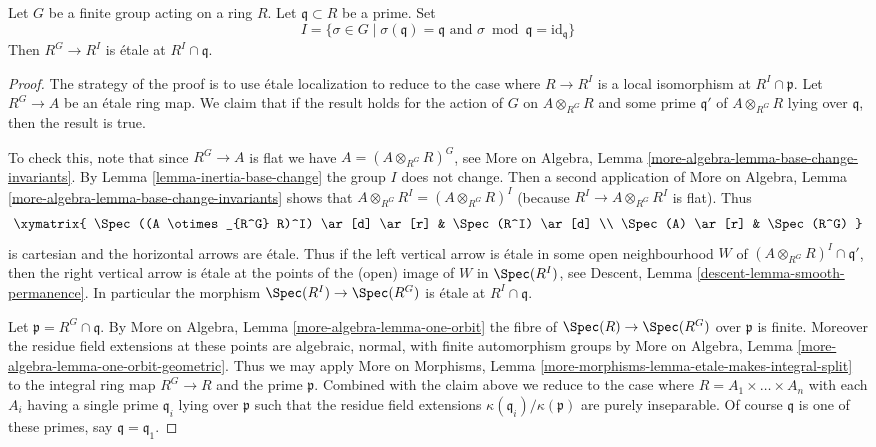 \begin{lemma}
\label{lemma-inertia-invariants-etale}
Let $G$ be a finite group acting on a ring $R$. Let $\mathfrak q \subset R$
be a prime. Set
$$
I = \{\sigma \in G \mid \sigma(\mathfrak q) = \mathfrak q
\text{ and } \sigma \bmod \mathfrak q = \text{id}_\mathfrak q\}
$$
Then $R^G \to R^I$ is \'etale at $R^I \cap \mathfrak q$.
\end{lemma}

\begin{proof}
The strategy of the proof is to use \'etale localization to
reduce to the case where $R \to R^I$ is a local isomorphism at
$R^I \cap \mathfrak p$.
Let $R^G \to A$ be an \'etale ring map. We claim that if the result
holds for the action of $G$ on $A \otimes_{R^G} R$ and some prime
$\mathfrak q'$ of $A \otimes_{R^G} R$ lying over $\mathfrak q$, then
the result is true.

\medskip\noindent
To check this, note that since $R^G \to A$ is flat we have
$A = (A \otimes_{R^G} R)^G$, see More on Algebra,
Lemma \ref{more-algebra-lemma-base-change-invariants}.
By Lemma \ref{lemma-inertia-base-change} the group $I$ does not change.
Then a second application of More on Algebra,
Lemma \ref{more-algebra-lemma-base-change-invariants}
shows that $A \otimes_{R^G} R^I = (A \otimes_{R^G} R)^I$
(because $R^I \to A \otimes_{R^G} R^I$ is flat).
Thus
$$
\xymatrix{
\Spec((A \otimes_{R^G} R)^I) \ar[d] \ar[r] & \Spec(R^I) \ar[d] \\
\Spec(A) \ar[r] & \Spec(R^G)
}
$$
is cartesian and the horizontal arrows are \'etale. Thus if the
left vertical arrow is \'etale in some open neighbourhood $W$ of
$(A \otimes_{R^G} R)^I \cap \mathfrak q'$, then the right vertical
arrow is \'etale at the points of the (open) image of $W$ in
$\Spec(R^I)$, see
Descent, Lemma \ref{descent-lemma-smooth-permanence}. In particular
the morphism $\Spec(R^I) \to \Spec(R^G)$ is \'etale at $R^I \cap \mathfrak q$.

\medskip\noindent
Let $\mathfrak p = R^G \cap \mathfrak q$.
By More on Algebra, Lemma \ref{more-algebra-lemma-one-orbit}
the fibre of $\Spec(R) \to \Spec(R^G)$ over $\mathfrak p$ is
finite. Moreover the residue field extensions at these points
are algebraic, normal, with finite automorphism groups by
More on Algebra, Lemma \ref{more-algebra-lemma-one-orbit-geometric}.
Thus we may apply
More on Morphisms,
Lemma \ref{more-morphisms-lemma-etale-makes-integral-split}
to the integral ring map $R^G \to R$ and the prime $\mathfrak p$.
Combined with the claim above we reduce to the case where
$R = A_1 \times \ldots \times A_n$ with each $A_i$ having a single
prime $\mathfrak q_i$ lying over $\mathfrak p$ such that the
residue field extensions $\kappa(\mathfrak q_i)/\kappa(\mathfrak p)$
are purely inseparable. Of course $\mathfrak q$ is one of
these primes, say $\mathfrak q = \mathfrak q_1$.


\end{proof}

